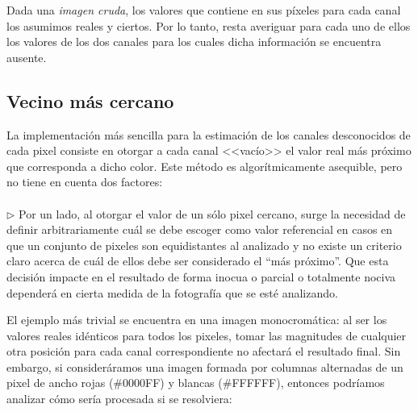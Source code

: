 \documentclass[a4paper]{article}
\begin{document}
Dada una \textit{imagen cruda}, los valores que contiene en sus píxeles para cada canal los asumimos reales y ciertos. Por lo tanto, resta averiguar para cada uno de ellos los valores de los dos canales para los cuales dicha información se encuentra ausente.

\subsection{Vecino m\'as cercano}
La implementación más sencilla para la estimación de los canales desconocidos de cada pixel consiste en otorgar a cada canal <<vacío>> el valor real m\'as pr\'oximo que corresponda a dicho color. Este m\'etodo es algor\'itmicamente asequible, pero no tiene en cuenta dos factores: \\
\\

$\triangleright$ Por un lado, al otorgar el valor de un sólo pixel cercano, surge la necesidad de definir arbitrariamente cuál se debe escoger como valor referencial en casos en que un conjunto de pixeles son equidistantes al analizado y no existe un criterio claro acerca de cuál de ellos debe ser considerado el ``más próximo''. Que esta decisión impacte en el resultado de forma inocua o parcial o totalmente nociva dependerá en cierta medida de la fotografía que se esté analizando.

El ejemplo más trivial se encuentra en una imagen monocromática: al ser los valores reales idénticos para todos los pixeles, tomar las magnitudes de cualquier otra posición para cada canal correspondiente no afectará el resultado final. Sin embargo, si consideráramos una imagen formada por columnas alternadas de un pixel de ancho rojas (\#0000FF) y blancas (\#FFFFFF), entonces podríamos analizar cómo sería procesada si se resolviera:
\end{document}
